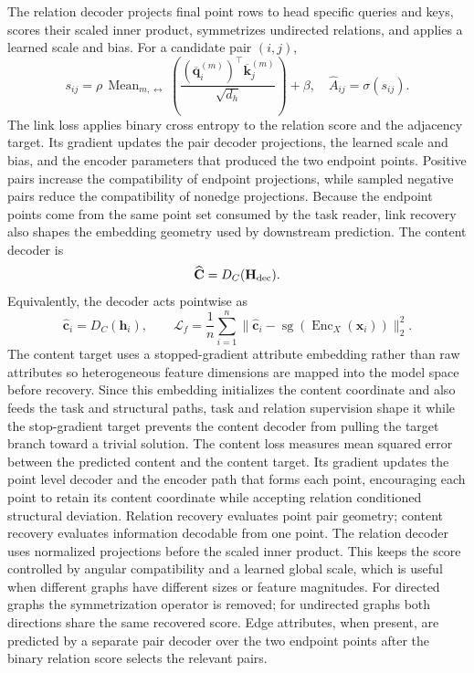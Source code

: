 The relation decoder projects final point rows to head specific queries and
keys, scores their scaled inner product, symmetrizes undirected relations, and
applies a learned scale and bias.  For a candidate pair $(i,j)$,
\begin{equation}
 s_{ij}=\rho\,\operatorname{Mean}_{m,\leftrightarrow}\!\left(\frac{(\overline{\mathbf q}_i^{(m)})^\top\overline{\mathbf k}_j^{(m)}}{\sqrt{d_h}}\right)+\beta,\quad \widehat A_{ij}=\sigma(s_{ij}).
 \label{eq:pairattn}
\end{equation}
The link loss applies binary cross entropy to the relation score and the
adjacency target.  Its gradient updates the pair decoder projections, the
learned scale and bias, and the encoder parameters that produced the two endpoint
points.  Positive pairs increase the compatibility of endpoint projections,
while sampled negative pairs reduce the compatibility of nonedge projections.
Because the endpoint points come from the same point set consumed by the task
reader, link recovery also shapes the embedding geometry used by downstream
prediction.  The content decoder is
\begin{equation}
 \widehat{\mathbf C}=D_C(\mathbf{H}_{\mathrm{dec}}).
 \label{eq:feat}
\end{equation}
Equivalently, the decoder acts pointwise as
\begin{equation}
 \widehat{\mathbf c}_i=D_C(\mathbf h_i),\qquad
 \mathcal L_f=\frac{1}{n}\sum_{i=1}^{n}
 \lVert\widehat{\mathbf c}_i-\operatorname{sg}(\operatorname{Enc}_X(\mathbf x_i))\rVert_2^2.
 \label{eq:content-recovery}
\end{equation}
The content target uses a stopped-gradient attribute embedding rather than raw
attributes so heterogeneous feature dimensions are mapped into the model space
before recovery.  Since this embedding initializes the content coordinate and
also feeds the task and structural paths, task and relation supervision shape
it while the stop-gradient target prevents the content decoder from pulling the
target branch toward a trivial solution.  The content loss measures mean squared error between the predicted content and
the content target.  Its gradient updates the point level decoder and the
encoder path that forms each point, encouraging each point to retain its content
coordinate while accepting relation conditioned structural deviation.  Relation
recovery evaluates point pair geometry; content recovery evaluates information
decodable from one point.
The relation decoder uses normalized projections before the scaled inner
product.  This keeps the score controlled by angular compatibility and a learned
global scale, which is useful when different graphs have different sizes or
feature magnitudes.  For directed graphs the symmetrization operator is removed;
for undirected graphs both directions share the same recovered score.  Edge
attributes, when present, are predicted by a separate pair decoder over
the two endpoint points after the binary relation score selects the relevant
pairs.


